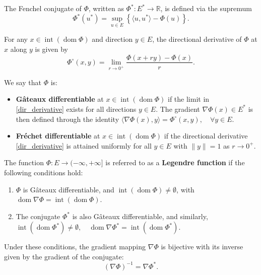 \documentclass[hidelinks,11 pt]{article}
\numberwithin{equation}{section}
\theoremstyle{definition}  %
\numberwithin{equation}{section}
\numberwithin{theorem}{section}
\begin{document}
\vskip 2mm
The Fenchel conjugate of \( \Phi \), written as \( \Phi^*: E^* \to \mathbb{R} \), is defined via the supremum
\[
\Phi^*(u^*) = \sup_{u \in E} \left\{ \langle u, u^* \rangle - \Phi(u) \right\}.
\]

\vskip 2mm
For any \( x \in \operatorname{int}(\operatorname{dom} \Phi) \) and direction \( y \in E \), the directional derivative of \( \Phi \) at \( x \) along \( y \) is given by
\begin{equation}\label{dir_derivative}
\Phi^{\circ}(x, y) = \lim_{r \to 0^+} \frac{\Phi(x + r y) - \Phi(x)}{r}.
\end{equation}

\vskip 2mm
We say that \( \Phi \) is:
\begin{itemize}
  \item \textbf{Gâteaux differentiable} at \( x \in \operatorname{int}(\operatorname{dom} \Phi) \) if the limit in \eqref{dir_derivative} exists for all directions \( y \in E \). The gradient \( \nabla \Phi(x) \in E^* \) is then defined through the identity
$  \langle \nabla \Phi(x), y \rangle = \Phi^{\circ}(x, y), \quad \forall y \in E$.
  \item \textbf{Fréchet differentiable} at \( x \in \operatorname{int}(\operatorname{dom} \Phi) \) if the directional derivative \eqref{dir_derivative} is attained uniformly for all \( y \in E \) with \( \|y\| = 1 \) as \( r \to 0^+ \).
\end{itemize}

\vskip 2mm
The function \( \Phi: E \to (-\infty, +\infty] \) is referred to as a \textbf{Legendre function} if the following conditions hold:
\begin{enumerate}
  \item \( \Phi \) is Gâteaux differentiable, and \( \operatorname{int}(\operatorname{dom} \Phi) \neq \emptyset \), with $\operatorname{dom} \nabla \Phi = \operatorname{int}(\operatorname{dom} \Phi)$.
  
  \item The conjugate \( \Phi^* \) is also Gâteaux differentiable, and similarly,
 $ \operatorname{int}(\operatorname{dom} \Phi^*) \neq \emptyset, \quad \operatorname{dom} \nabla \Phi^* = \operatorname{int}(\operatorname{dom} \Phi^*)$.

\end{enumerate}

Under these conditions, the gradient mapping \( \nabla \Phi \) is bijective with its inverse given by the gradient of the conjugate:
\[
(\nabla \Phi)^{-1} = \nabla \Phi^*.
\]
\end{document}
